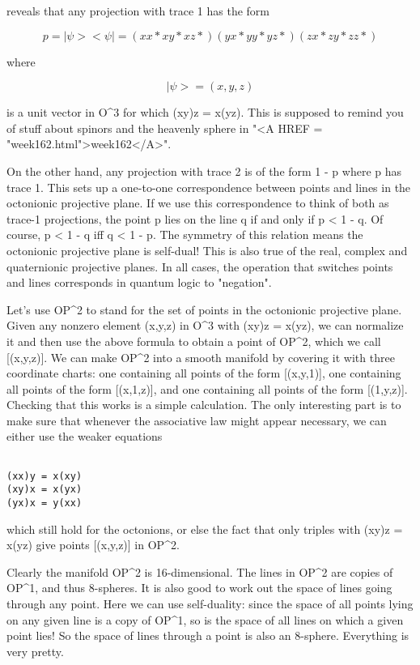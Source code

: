 reveals that any projection with trace 1 has the form


$$

p = |\psi > <\psi | = ( xx*   xy*    xz* )
                  ( yx*   yy*    yz* )
                  ( zx*   zy*    zz* )
$$
    
where 


$$

|\psi > = (x,y,z) 
$$
    
is a unit vector in O^{3} for which (xy)z = x(yz).  This is
supposed to remind you of stuff about spinors and the heavenly sphere in
"<A HREF = "week162.html">week162</A>".

On the other hand, any projection with trace 2 is of the form 1 - p
where p has trace 1.  This sets up a one-to-one correspondence between
points and lines in the octonionic projective plane.  If we use this
correspondence to think of both as trace-1 projections, the point p
lies on the line q if and only if p < 1 - q.  Of course, p < 1 - q
iff q < 1 - p.   The symmetry of this relation means the octonionic
projective plane is self-dual!  This is also true of the real, complex
and quaternionic projective planes.  In all cases, the operation that
switches points and lines corresponds in quantum logic to "negation".

Let's use OP^{2} to stand for the set of points in the
octonionic projective plane.  Given any nonzero element (x,y,z) in
O^{3} with (xy)z = x(yz), we can normalize it and then use the
above formula to obtain a point of OP^{2}, which we call
[(x,y,z)].  We can make OP^{2} into a smooth manifold by
covering it with three coordinate charts: one containing all points of
the form [(x,y,1)], one containing all points of the form [(x,1,z)], and
one containing all points of the form [(1,y,z)].  Checking that this
works is a simple calculation.  The only interesting part is to make
sure that whenever the associative law might appear necessary, we can
either use the weaker equations


\begin{verbatim}

(xx)y = x(xy) 
(xy)x = x(yx)
(yx)x = y(xx)
\end{verbatim}
    
which still hold for the octonions, or else the fact that only triples
with (xy)z = x(yz) give points [(x,y,z)] in OP^{2}.  

Clearly the manifold OP^{2} is 16-dimensional.  The lines in
OP^{2} are copies of OP^{1}, and thus 8-spheres.  It is
also good to work out the space of lines going through any point.  Here
we can use self-duality: since the space of all points lying on any
given line is a copy of OP^{1}, so is the space of all lines on
which a given point lies!  So the space of lines through a point is also
an 8-sphere.  Everything is very pretty.


